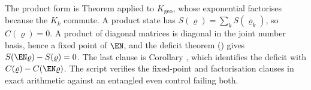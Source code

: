 The product form is Theorem  applied to $K_{\mathrm{geo}}$, whose exponential factorises because the $K_k$ commute. A product state has $S(\varrho) = \sum_k S(\varrho_k)$, so $C(\varrho) = 0$. A product of diagonal matrices is diagonal in the joint number basis, hence a fixed point of $\EN$, and the deficit theorem () gives $S(\EN\varrho) - S(\varrho) = 0$. The last clause is Corollary , which identifies the deficit with $C(\varrho) - C(\EN\varrho)$. The script verifies the fixed-point and factorisation clauses in exact arithmetic against an entangled even control failing both.
